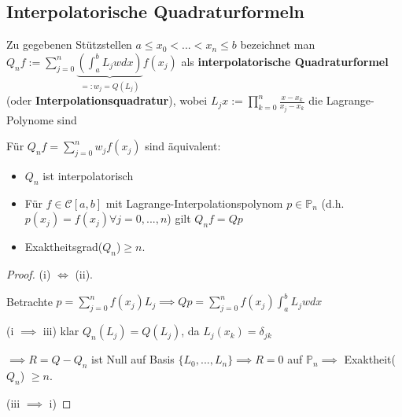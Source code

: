 \subsection{Interpolatorische Quadraturformeln}

\begin{definition}
	Zu gegebenen Stützstellen $a \leq x_0 < ... < x_n \leq b$ bezeichnet man $Q_nf := \sum_{j=0}^{n} \underbrace{\left(\int_{a}^{b} L_jw dx\right)}_{=: w_j = Q(L_j)} f(x_j)$ als \textbf{interpolatorische Quadraturformel} (oder \textbf{Interpolationsquadratur}), wobei $L_jx := \prod_{k=0}^{n}\frac{x - x_k}{x_j - x_k}$ die Lagrange-Polynome sind
\end{definition}

\begin{theorem}
	Für $Q_nf = \sum_{j=0}^{n} w_j f(x_j)$ sind äquivalent:
	\begin{itemize}
		\item $Q_n$ ist interpolatorisch
		\item Für $f \in \mathcal{C}[a,b]$ mit Lagrange-Interpolationspolynom $p \in \mathbb{P}_n$ (d.h. $p(x_j) = f(x_j) \forall j=0, ..., n$) gilt $Q_nf = Qp$
		\item Exaktheitsgrad($Q_n$)$\geq n$.
	\end{itemize}
\end{theorem}

\begin{proof}
	(i) $\iff$ (ii).
	
	Betrachte $p = \sum_{j=0}^{n} f(x_j)L_j \implies Qp = \sum_{j=0}^{n} f(x_j) \int_{a}^{b}L_jw dx$
	
	(i $\implies$ iii) klar $Q_n(L_j) = Q(L_j)$, da $L_j(x_k) = \delta_{jk}$
	
	$\implies R=Q-Q_n$ ist Null auf Basis $\{L_0, ..., L_n\} \implies R=0$ auf $\mathbb{P}_n \implies$ Exaktheit($Q_n$) $\geq n$.
	
	(iii $\implies$ i) \checkmark
\end{proof}

